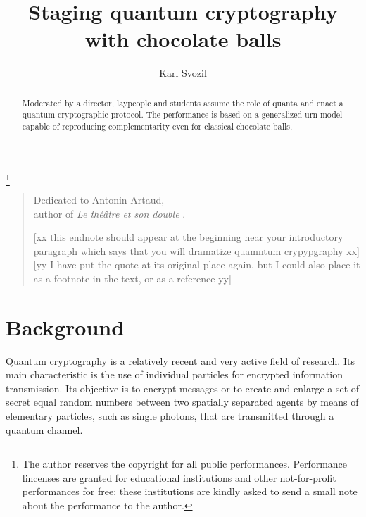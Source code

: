 \documentclass[prb,amssymb,preprint]{revtex4}
\begin{document}
\title{Staging quantum cryptography with chocolate balls}

\thanks{The author reserves the copyright for all public performances.
Performance lincenses are granted for educational institutions
and other not-for-profit performances for free;
these institutions are kindly asked to send a small note about the
performance to the author.}

\author{Karl Svozil}

\begin{abstract}
Moderated by a director, laypeople and students assume the
role of quanta and enact a quantum cryptographic protocol. The performance
is based on a generalized urn model capable of reproducing complementarity
even for classical chocolate balls.
\end{abstract}



\maketitle

\begin{quote}
\begin{flushright}
{%
Dedicated to Antonin Artaud, \\
author of {\it Le th{\'{e}}{\^{a}}tre et son double} \cite{Arthaud}.
 }
\end{flushright}
[xx this endnote should
appear at the beginning near your introductory paragraph which says that
you will dramatize quamntum crypypgraphy xx]
[yy I have put the quote at its original place again, but I could also place it as a footnote in the text, or as a reference yy]
\end{quote}

\section{Background}

Quantum cryptography is a relatively recent and very active field of
research. Its main characteristic is the use of individual particles for
encrypted information transmission. Its objective is to encrypt messages or
to create and enlarge a set of secret equal random numbers between two
spatially separated agents by means of elementary particles, such as single
photons, that are transmitted through a quantum channel.
\end{document}
